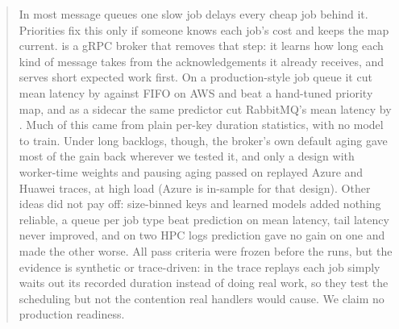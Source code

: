 \begin{abstract}
In most message queues one slow job delays every cheap job behind it. Priorities fix this only if someone knows each job's cost and keeps the map current.
\sys{} is a gRPC broker that removes that step: it learns how long each kind of message takes from the acknowledgements it already receives, and serves short expected work first.
On a production-style job queue it cut mean latency by \EOneMeanVsFifoAbs{} against FIFO on AWS and beat a hand-tuned priority map, and as a sidecar the same predictor cut RabbitMQ's mean latency by \EThreeSidecarAbs{}.
Much of this came from plain per-key duration statistics, with no model to train. Under long backlogs, though, the broker's own default aging gave most of the gain back wherever we tested it, and only a design with worker-time weights and pausing aging passed on replayed Azure and Huawei traces, at high load (Azure is in-sample for that design).
Other ideas did not pay off: size-binned keys and learned models added nothing reliable, a queue per job type beat prediction on mean latency, tail latency never improved, and on two HPC logs prediction gave no gain on one and made the other worse.
All pass criteria were frozen before the runs, but the evidence is synthetic or trace-driven: in the trace replays each job simply waits out its recorded duration instead of doing real work, so they test the scheduling but not the contention real handlers would cause. We claim no production readiness.
\end{abstract}
